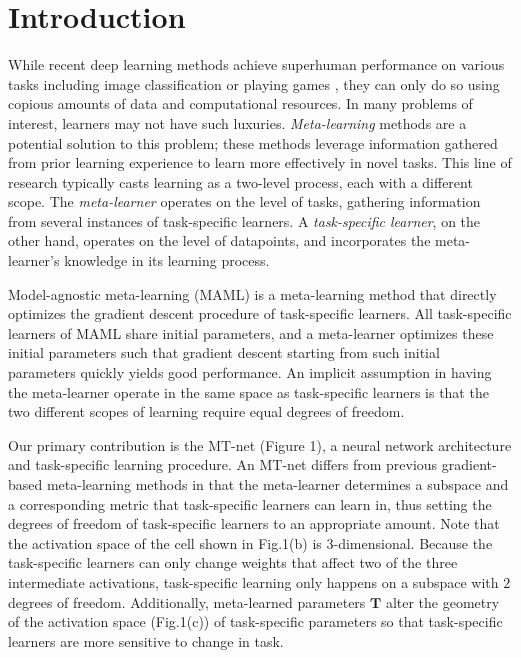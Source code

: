 \documentclass{article}
\newcommand{\T}{\mathbf{T}}
\begin{document}
\section{Introduction}
\label{sec:introduction}

While recent deep learning methods achieve superhuman performance on various tasks including image classification 
\cite{Krizhevsky2012nips} or playing games \cite{MnihV2015nature}, they can only do so using copious amounts of data and computational resources.
In many problems of interest, learners may not have such luxuries.
\textit{Meta-learning} \cite{SchmidhuberJ87phd,SchmidhuberJ97mlj,ThrunS98book} methods are a potential solution to this problem; 
these methods leverage information gathered from prior learning experience to learn more effectively in novel tasks.
This line of research typically casts learning as a two-level process, each with a different scope.
The \emph{meta-learner} operates on the level of tasks, gathering information from several instances of task-specific learners.
A \emph{task-specific learner}, on the other hand, operates on the level of datapoints, and incorporates the meta-learner's knowledge in its learning process.

Model-agnostic meta-learning (MAML) \cite{FinnC2017icml} is a meta-learning method that directly optimizes the gradient descent procedure of task-specific learners.
All task-specific learners of MAML share initial parameters, and a meta-learner optimizes these initial parameters such that gradient descent 
starting from such initial parameters quickly yields good performance.
An implicit assumption in having the meta-learner operate in the same space as task-specific learners is that the two different scopes of learning
require equal degrees of freedom.

Our primary contribution is the MT-net (Figure 1), a neural network architecture and task-specific learning procedure.
An MT-net differs from previous gradient-based meta-learning methods in that the meta-learner determines a subspace and a corresponding metric 
that task-specific learners can learn in, thus setting the degrees of freedom of task-specific learners to an appropriate amount.
Note that the activation space of the cell shown in Fig.1(b) is $3$-dimensional.
Because the task-specific learners can only change weights that affect two of the three intermediate activations, 
task-specific learning only happens on a subspace with $2$ degrees of freedom.
Additionally, meta-learned parameters $\T$ alter the geometry of the activation space (Fig.1(c)) of task-specific parameters
so that task-specific learners are more sensitive to change in task.
\end{document}
